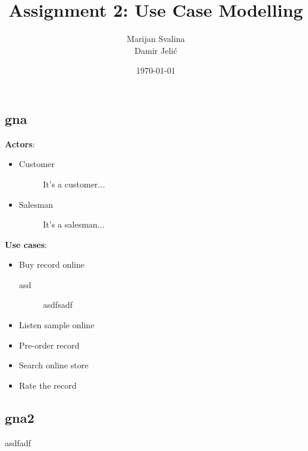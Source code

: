 \documentclass[12pt, titlepage]{article}
\title{Assignment 2: Use Case Modelling}
\date{\today}
\author{Marijan Svalina \\ Damir Jelić}
\begin{document}
\maketitle 

\setcounter{section}{2}
\subsection{gna}
{\bf Actors}:
\begin{itemize}
\item
    Customer
    \begin{description}
    \item[] It's a customer...
    \end{description}
\item
    Salesman
    \begin{description}
    \item[] It's a salesman...
    \end{description}
\end{itemize}
{\bf Use cases}:
\begin{itemize}
\item
    Buy record online
    \begin{description}
    \item[asd]
    asdfsadf
    \end{description}
\item
    Listen sample online
\item
    Pre-order record
\item 
    Search online store
\item 
    Rate the record
\end{itemize}
\subsection{gna2}
asdfadf
\end{document}
